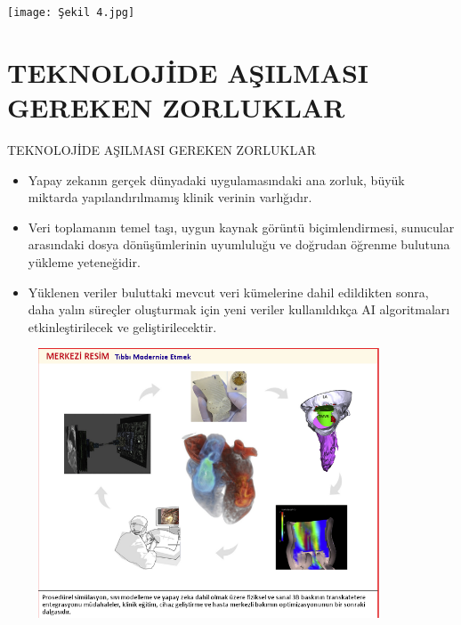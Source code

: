 \documentclass{beamer}
\begin{document}
\begin{frame}{}
\begin{block}{}
\texttt{[image: Şekil 4.jpg]}
\end{block}
\end{frame}

\section{TEKNOLOJİDE AŞILMASI GEREKEN ZORLUKLAR}

\begin{frame}{TEKNOLOJİDE AŞILMASI GEREKEN ZORLUKLAR}

\begin{itemize}
  \item Yapay zekanın gerçek dünyadaki uygulamasındaki ana zorluk, büyük miktarda yapılandırılmamış klinik verinin varlığıdır. 
  \item Veri toplamanın temel taşı, uygun kaynak görüntü biçimlendirmesi, sunucular arasındaki dosya dönüşümlerinin uyumluluğu ve doğrudan öğrenme bulutuna yükleme yeteneğidir. 
  \item Yüklenen veriler buluttaki mevcut veri kümelerine dahil edildikten sonra, daha yalın süreçler oluşturmak için yeni veriler kullanıldıkça AI algoritmaları etkinleştirilecek ve geliştirilecektir. 
\end{itemize}

\end{frame}

\begin{frame}{}
\begin{block}{}
\includegraphics[width=12cm,height=8cm]{Merkezi Resim.png}
\end{block}
\end{frame}
\end{document}
